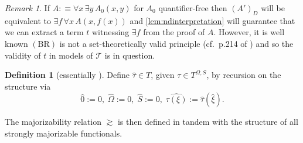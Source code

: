 \documentclass[11pt]{amsart}
\theoremstyle{definition}
\newtheorem{definition}[theorem]{Definition}
\theoremstyle{remark}
\newtheorem{remark}[theorem]{Remark}
\begin{document}
\begin{remark}
\label{rem:soundness}
If $A:\equiv \forall x\,\exists y\, A_0(x,y)$ for $A_0$ quantifier-free then $(A')_D$ will be equivalent to $\exists f\, \forall x\, A(x,f(x))$ and \ref{lem:ndinterpretation} will guarantee that we can extract a term $t$ witnessing $\exists f$ from the proof of $A$. However, it is well known $(\mathrm{BR})$ is not a set-theoretically valid principle (cf.\ p.214 of \cite{Kohlenbach2008}) and so the validity of $t$ in models of $\mathcal{T}$ is in question. 
\end{remark}
\begin{definition}[essentially \cite{GeK2008}]
Define $\widehat{\tau}\in T$, given $\tau\in T^{\Omega,S}$, by recursion on the structure via
\[
\widehat{0}:=0,\;\widehat{\Omega}:=0,\;\widehat{S}:=0,\;\widehat{\tau(\xi)}:=\widehat{\tau}(\widehat{\xi}).
\]
\end{definition}

The majorizability relation $\gtrsim$ is then defined in tandem with the structure of all strongly majorizable functionals.
\end{document}
